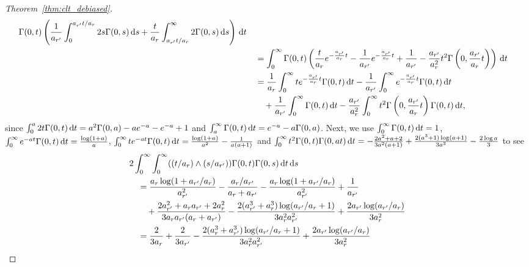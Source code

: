 \begin{proof}[Theorem~\ref{thm:clt_debiased}]
\begin{align*}
    \Gamma(0, t)
    \left(
      \frac{1}{a_{r'}}
      \int_0^{a_{r'} t / a_r}
      2 s \Gamma(0, s)
      \,\mathrm{d}s
      +
      \frac{t}{a_r}
      \int_{a_{r'} t / a_r}^\infty
      2 \Gamma(0, s)
      \,\mathrm{d}s
    \right)
    \,\mathrm{d}t \\
    &\quad=
    \int_0^\infty
    \Gamma(0, t)
    \left(
      \frac{t}{a_r}
      e^{- \frac{a_{r'}}{a_r}t}
      - \frac{1}{a_{r'}} e^{- \frac{a_{r'}}{a_r}t}
      + \frac{1}{a_{r'}}
      - \frac{a_{r'}}{a_r^2} t^2
      \Gamma\left(0, \frac{a_{r'}}{a_r} t\right)
    \right)
    \,\mathrm{d}t \\
    &\quad=
    \frac{1}{a_r}
    \int_0^\infty
    t e^{- \frac{a_{r'}}{a_r} t}
    \Gamma(0, t)
    \,\mathrm{d}t
    - \frac{1}{a_{r'}}
    \int_0^\infty
    e^{- \frac{a_{r'}}{a_r} t}
    \Gamma(0, t)
    \,\mathrm{d}t \\
    &\qquad+
    \frac{1}{a_{r'}}
    \int_0^\infty
    \Gamma(0, t)
    \,\mathrm{d}t
    -
    \frac{a_{r'}}{a_r^2}
    \int_0^\infty
    t^2 \Gamma\left(0, \frac{a_{r'}}{a_r} t\right)
    \Gamma(0, t)
    \,\mathrm{d}t,
  \end{align*}
  since
  $\int_0^a 2 t \Gamma(0, t) \,\mathrm{d}t = a^2 \Gamma(0, a) - a e^{-a} -e^{-a} + 1$
  and
  $\int_a^\infty \Gamma(0, t) \,\mathrm{d}t = e^{-a} - a \Gamma(0, a)$.
  Next, we use
  $ \int_{0}^{\infty} \Gamma(0, t) \,\mathrm{d}t = 1$,
  $\int_{0}^{\infty} e^{-at} \Gamma(0, t) \,\mathrm{d}t
  = \frac{\log(1+a)}{a}$,
  $\int_{0}^{\infty} t e^{-at} \Gamma(0, t) \,\mathrm{d}t
  = \frac{\log(1+a)}{a^2} - \frac{1}{a(a+1)}$
  and
  $\int_{0}^{\infty} t^2 \Gamma(0, t) \Gamma(0, at) \,\mathrm{d}t
  = - \frac{2a^2 + a + 2}{3a^2 (a+1)} + \frac{2(a^3 + 1) \log(a+1)}{3a^3}
  - \frac{2 \log a}{3}$
  to see
  \begin{align*}
    &2
    \int_{0}^{\infty}
    \int_{0}^{\infty}
    ((t / a_r) \wedge (s / a_{r'}))
    \Gamma(0, t)
    \Gamma(0, s)
    \diff t
    \diff s \\
    &\quad=
    \frac{a_r \log(1+a_{r'} / a_r)}{a_{r'}^2}
    - \frac{a_r / a_{r'}}{a_r + a_{r'}}
    - \frac{a_r \log(1 + a_{r'} / a_r)}{a_{r'}^2}
    + \frac{1}{a_{r'}} \\
    &\qquad+
    \frac{2 a_{r'}^2 + a_r a_{r'} + 2 a_r^2}
    {3 a_r a_{r'} (a_r + a_{r'})}
    - \frac{2(a_{r'}^3 + a_r^3) \log(a_{r'} / a_r+1)}{3 a_r^2 a_{r'}^2}
    + \frac{2 a_{r'} \log (a_{r'} / a_r)}{3 a_r^2} \\
    &\quad=
    \frac{2}{3 a_r} + \frac{2}{3 a_{r'}}
    - \frac{2(a_r^3 + a_{r'}^3 ) \log(a_{r'} / a_{r}+1)}
    {3 a_r^2 a_{r'}^2}
    + \frac{2 a_{r'} \log (a_{r'} / a_{r})}{3 a_r^2} \\

\end{align*}
\end{proof}
